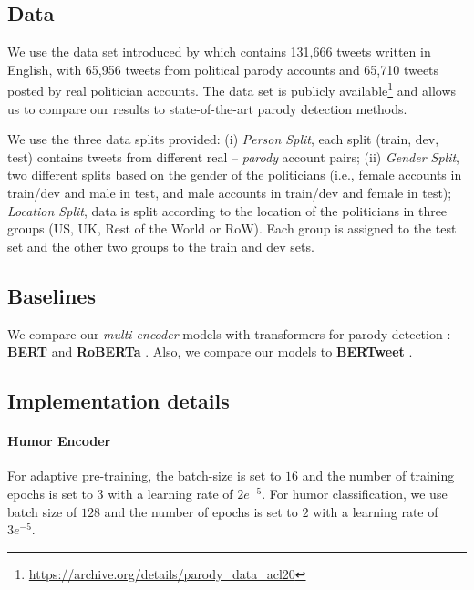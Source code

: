 \documentclass[11pt]{article}
\begin{document}
\subsection{Data}
\label{sec:data}

We use the data set introduced by \citet{maronikolakis-etal-2020-analyzing} which contains 131,666 tweets written in English, with 65,956 tweets from political parody accounts and 65,710 tweets posted by real politician accounts. The data set is publicly available\footnote{\url{https://archive.org/details/parody_data_acl20}} and allows us to compare our results to state-of-the-art parody detection methods.  

We use the three data splits provided: (i) \emph{Person Split}, each split (train, dev, test) contains tweets from different real -- \emph{parody} account pairs; (ii) \emph{Gender Split}, two different splits based on the gender of the politicians (i.e., female accounts in train/dev and male in test, and male accounts in train/dev and female in test); \emph{Location Split}, data is split according to the location of the politicians in three groups (US, UK, Rest of the World or RoW). Each group is assigned to the test set and the other two groups to the train and dev sets.




\subsection{Baselines} 

We compare our \emph{multi-encoder} models with %
transformers for parody detection \citep{maronikolakis-etal-2020-analyzing}: {\bf BERT} \citep{devlin-etal-2019-bert} and {\bf RoBERTa} \citep{liu2019roberta}. Also, we compare our models to {\bf BERTweet} \citep{nguyen-etal-2020-bertweet}. 

\subsection{Implementation details}
\label{imp_details}

\paragraph{Humor Encoder} 
For adaptive pre-training, the batch-size is set to $16$ and the number of training epochs is set to $3$ with a learning rate of $2e^{-5}$. For humor classification, we use batch size of $128$ and the number of epochs is set to $2$ with a learning rate of $3e^{-5}$.
\end{document}
